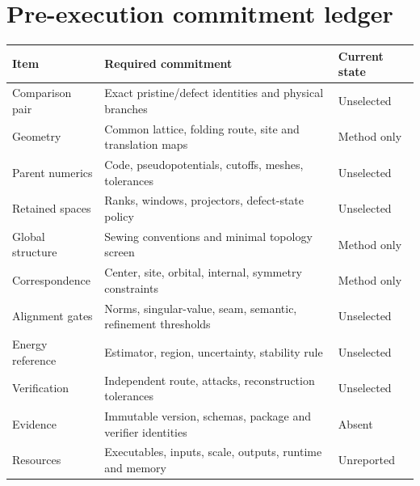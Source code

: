 \documentclass[11pt]{article}
\begin{document}
\section{Pre-execution commitment ledger}
\begin{center}\small
\begin{tabularx}{\textwidth}{p{}YY}
\toprule
\textbf{Item} & \textbf{Required commitment} & \textbf{Current state} \\
\midrule
Comparison pair & Exact pristine/defect identities and physical branches & Unselected \\
Geometry & Common lattice, folding route, site and translation maps & Method only \\
Parent numerics & Code, pseudopotentials, cutoffs, meshes, tolerances & Unselected \\
Retained spaces & Ranks, windows, projectors, defect-state policy & Unselected \\
Global structure & Sewing conventions and minimal topology screen & Method only \\
Correspondence & Center, site, orbital, internal, symmetry constraints & Method only \\
Alignment gates & Norms, singular-value, seam, semantic, refinement thresholds & Unselected \\
Energy reference & Estimator, region, uncertainty, stability rule & Unselected \\
Verification & Independent route, attacks, reconstruction tolerances & Unselected \\
Evidence & Immutable version, schemas, package and verifier identities & Absent \\
Resources & Executables, inputs, scale, outputs, runtime and memory & Unreported \\
\bottomrule
\end{tabularx}
\end{center}
\end{document}
